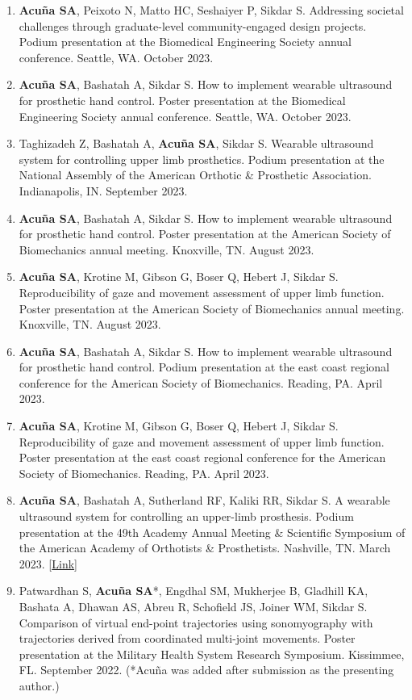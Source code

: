 \documentclass[letterpaper, 10pt]{article}
\begin{document}
\begin{enumerate}
    \item \textbf{Acuña SA}, Peixoto N, Matto HC, Seshaiyer P, Sikdar S. Addressing societal challenges through graduate-level community-engaged design projects. Podium presentation at the Biomedical Engineering Society annual conference. Seattle, WA. October 2023.
    \item \textbf{Acuña SA}, Bashatah A, Sikdar S. How to implement wearable ultrasound for prosthetic hand control. Poster presentation at the Biomedical Engineering Society annual conference. Seattle, WA. October 2023.
    \item Taghizadeh Z, Bashatah A, \textbf{Acuña SA}, Sikdar S. Wearable ultrasound system for controlling upper limb prosthetics. Podium presentation at the National Assembly of the American Orthotic \& Prosthetic Association. Indianapolis, IN. September 2023.
    \item \textbf{Acuña SA}, Bashatah A, Sikdar S. How to implement wearable ultrasound for prosthetic hand control. Poster presentation at the American Society of Biomechanics annual meeting. Knoxville, TN. August 2023.
     \item \textbf{Acuña SA}, Krotine M, Gibson G, Boser Q, Hebert J, Sikdar S. Reproducibility of gaze and movement assessment of upper limb function. Poster presentation at the American Society of Biomechanics annual meeting. Knoxville, TN. August 2023.
    \item \textbf{Acuña SA}, Bashatah A, Sikdar S. How to implement wearable ultrasound for prosthetic hand control. Podium presentation at the east coast regional conference for the American Society of Biomechanics. Reading, PA. April 2023.
     \item \textbf{Acuña SA}, Krotine M, Gibson G, Boser Q, Hebert J, Sikdar S. Reproducibility of gaze and movement assessment of upper limb function. Poster presentation at the east coast regional conference for the American Society of Biomechanics. Reading, PA. April 2023.
    \item \textbf{Acuña SA}, Bashatah A, Sutherland RF, Kaliki RR, Sikdar S. A wearable ultrasound system for controlling an upper-limb prosthesis. Podium presentation at the 49th Academy Annual Meeting \& Scientiﬁc Symposium of the American Academy of Orthotists \& Prosthetists. Nashville, TN. March 2023. [\href{https://journals.lww.com/jpojournal/Citation/2023/04001/UPPER_LIMB_PROSTHESES.10.aspx}{Link}]
    \item Patwardhan S, \textbf{Acuña SA}*, Engdhal SM, Mukherjee B, Gladhill KA, Bashata A, Dhawan AS, Abreu R, Schofield JS, Joiner WM,  Sikdar S. Comparison of virtual end-point trajectories using sonomyography with trajectories derived from coordinated multi-joint movements. Poster presentation at the Military Health System Research Symposium. Kissimmee, FL. September 2022. (*Acuña was added after submission as the presenting author.)

\end{enumerate}
\end{document}
